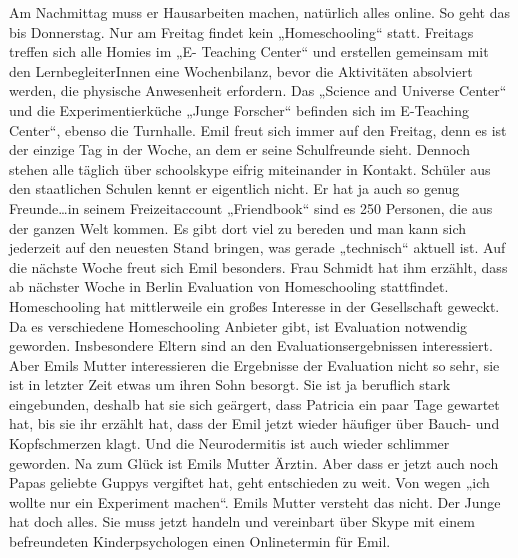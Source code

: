 \documentclass[12pt,a4paper]{article}
\begin{document}
\begin{appendix}
Am Nachmittag muss er Hausarbeiten machen, natürlich alles online. So geht das bis Donnerstag. Nur am Freitag findet kein „Homeschooling“ statt. Freitags treffen sich alle Homies im „E- Teaching Center“ und erstellen gemeinsam mit den LernbegleiterInnen eine Wochenbilanz, bevor die Aktivitäten absolviert werden, die physische Anwesenheit erfordern. Das „Science and Universe Center“ und die Experimentierküche „Junge Forscher“ befinden sich im E-Teaching Center“, ebenso die Turnhalle. Emil freut sich immer auf den Freitag, denn es ist der einzige Tag in der Woche, an dem er seine Schulfreunde sieht. Dennoch stehen alle täglich über schoolskype eifrig miteinander in Kontakt. Schüler aus den staatlichen Schulen kennt er eigentlich nicht. Er hat ja auch so genug Freunde…in seinem Freizeitaccount „Friendbook“ sind es 250 Personen, die  aus der ganzen Welt kommen. Es gibt dort viel zu bereden und man kann sich jederzeit auf den neuesten Stand bringen, was gerade „technisch“ aktuell ist.
Auf die nächste Woche freut sich Emil besonders. Frau Schmidt hat ihm erzählt, dass ab nächster Woche in Berlin Evaluation von Homeschooling stattfindet. Homeschooling hat mittlerweile ein großes Interesse in der Gesellschaft geweckt. Da es verschiedene Homeschooling Anbieter gibt, ist Evaluation notwendig geworden. Insbesondere Eltern sind an den Evaluationsergebnissen interessiert.
Aber Emils Mutter interessieren die Ergebnisse der Evaluation nicht so sehr, sie ist in letzter Zeit etwas um ihren Sohn besorgt. Sie ist ja beruflich stark eingebunden, deshalb hat sie sich geärgert, dass Patricia ein paar Tage gewartet hat, bis sie ihr erzählt hat, dass der Emil jetzt wieder häufiger über Bauch- und Kopfschmerzen klagt. Und die Neurodermitis ist auch wieder schlimmer geworden. Na zum Glück ist Emils Mutter Ärztin.
Aber dass er jetzt auch noch Papas geliebte Guppys vergiftet hat, geht entschieden zu weit. Von wegen „ich wollte nur ein Experiment machen“. Emils Mutter versteht das nicht. Der Junge hat doch alles. Sie muss jetzt handeln und vereinbart über Skype mit einem befreundeten Kinderpsychologen einen Onlinetermin für Emil.


\end{appendix}
\end{document}
